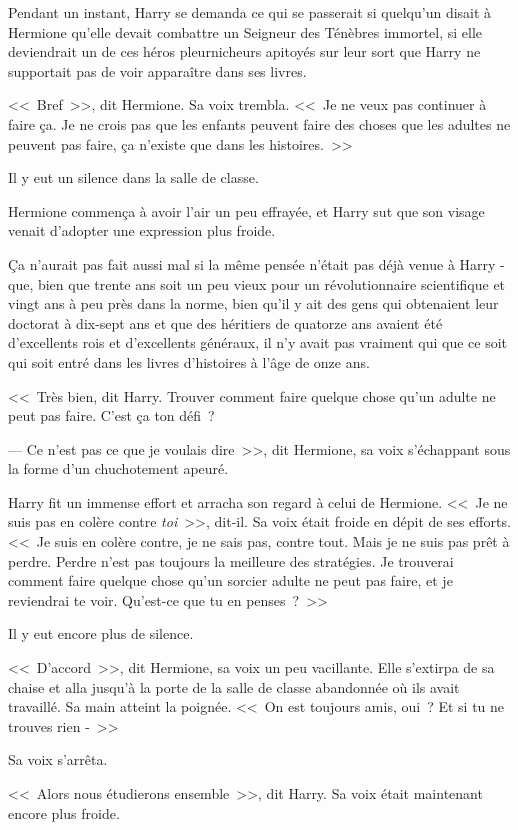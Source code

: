Pendant un instant, Harry se demanda ce qui se passerait si quelqu'un disait à Hermione qu'elle devait combattre un Seigneur des Ténèbres immortel, si elle deviendrait un de ces héros pleurnicheurs apitoyés sur leur sort que Harry ne supportait pas de voir apparaître dans ses livres.

<<~Bref~>>, dit Hermione. Sa voix trembla. <<~Je ne veux pas continuer à faire ça. Je ne crois pas que les enfants peuvent faire des choses que les adultes ne peuvent pas faire, ça n'existe que dans les histoires.~>>

Il y eut un silence dans la salle de classe.

Hermione commença à avoir l'air un peu effrayée, et Harry sut que son visage venait d'adopter une expression plus froide.

Ça n'aurait pas fait aussi mal si la même pensée n'était pas déjà venue à Harry - que, bien que trente ans soit un peu vieux pour un révolutionnaire scientifique et vingt ans à peu près dans la norme, bien qu'il y ait des gens qui obtenaient leur doctorat à dix-sept ans et que des héritiers de quatorze ans avaient été d'excellents rois et d'excellents généraux, il n'y avait pas vraiment qui que ce soit qui soit entré dans les livres d'histoires à l'âge de onze ans.

<<~Très bien, dit Harry. Trouver comment faire quelque chose qu'un adulte ne peut pas faire. C'est ça ton défi~?

--- Ce n'est pas ce que je voulais dire~>>, dit Hermione, sa voix s'échappant sous la forme d'un chuchotement apeuré.

Harry fit un immense effort et arracha son regard à celui de Hermione. <<~Je ne suis pas en colère contre \emph{toi}~>>, dit-il. Sa voix était froide en dépit de ses efforts. <<~Je suis en colère contre, je ne sais pas, contre tout. Mais je ne suis pas prêt à perdre. Perdre n'est pas toujours la meilleure des stratégies. Je trouverai comment faire quelque chose qu'un sorcier adulte ne peut pas faire, et je reviendrai te voir. Qu'est-ce que tu en penses~?~>>

Il y eut encore plus de silence.

<<~D'accord~>>, dit Hermione, sa voix un peu vacillante. Elle s'extirpa de sa chaise et alla jusqu'à la porte de la salle de classe abandonnée où ils avait travaillé. Sa main atteint la poignée. <<~On est toujours amis, oui~? Et si tu ne trouves rien -~>>

Sa voix s'arrêta.

<<~Alors nous étudierons ensemble~>>, dit Harry. Sa voix était maintenant encore plus froide.


